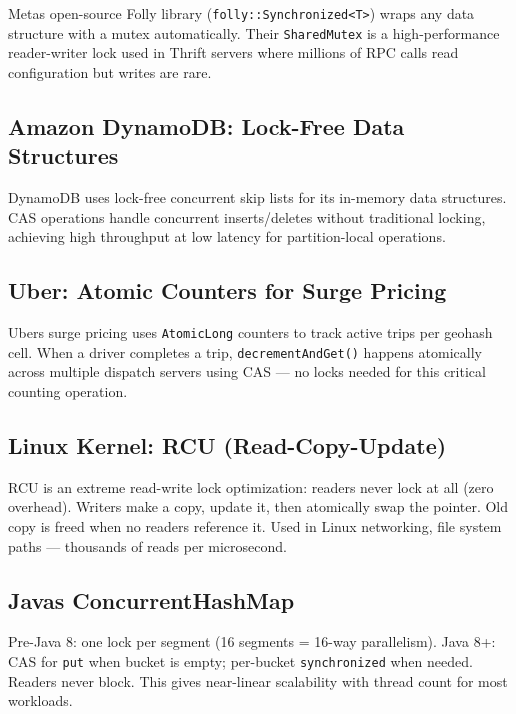 \documentclass[11pt]{article}
\begin{document}
Meta\textquotesingle s open-source Folly library (\texttt{folly::Synchronized\textless{}T\textgreater{}}) wraps any data structure with a mutex automatically. Their \texttt{SharedMutex} is a high-performance reader-writer lock used in Thrift servers where millions of RPC calls read configuration but writes are rare.

\subsection{Amazon DynamoDB: Lock-Free Data Structures}\label{amazon-dynamodb-lock-free-data-structures}

DynamoDB uses lock-free concurrent skip lists for its in-memory data structures. CAS operations handle concurrent inserts/deletes without traditional locking, achieving high throughput at low latency for partition-local operations.

\subsection{Uber: Atomic Counters for Surge Pricing}\label{uber-atomic-counters-for-surge-pricing}

Uber\textquotesingle s surge pricing uses \texttt{AtomicLong} counters to track active trips per geohash cell. When a driver completes a trip, \texttt{decrementAndGet()} happens atomically across multiple dispatch servers using CAS --- no locks needed for this critical counting operation.

\subsection{Linux Kernel: RCU (Read-Copy-Update)}\label{linux-kernel-rcu-read-copy-update}

RCU is an extreme read-write lock optimization: readers never lock at all (zero overhead). Writers make a copy, update it, then atomically swap the pointer. Old copy is freed when no readers reference it. Used in Linux networking, file system paths --- thousands of reads per microsecond.

\subsection{Java\textquotesingle s ConcurrentHashMap}\label{javas-concurrenthashmap}

Pre-Java 8: one lock per segment (16 segments = 16-way parallelism). Java 8+: CAS for \texttt{put} when bucket is empty; per-bucket \texttt{synchronized} when needed. Readers never block. This gives near-linear scalability with thread count for most workloads.
\end{document}
